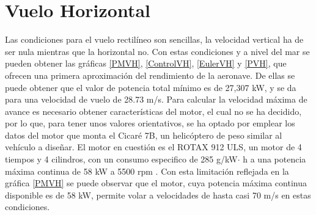 \thispagestyle{empty}
\chapter{Vuelo Horizontal}


Las condiciones para el vuelo rectilíneo son sencillas, la velocidad vertical ha de ser nula mientras que la horizontal no. Con estas condiciones y a nivel del mar se pueden obtener las gráficas \ref{PMVH}, \ref{ControlVH}, \ref{EulerVH} y \ref{PVH}, que ofrecen una primera aproximación del rendimiento de la aeronave. De ellas se puede obtener que el valor de potencia total mínimo es de 27,307 kW, y se da para una velocidad de vuelo de 28.73 m/s. Para calcular la velocidad máxima de avance es necesario obtener características del motor, el cual no se ha decidido, por lo que, para tener unos valores orientativos, se ha optado por emplear los datos del motor que monta el Cicaré 7B, un helicóptero de peso similar al vehículo a diseñar. El motor en cuestión es el ROTAX 912 ULS, un motor de 4 tiempos y 4 cilindros, con un consumo especifico de 285 g/kW$\cdot$ h a una potencia máxima continua de 58 kW a 5500 rpm \citep{ROTAX}. Con esta limitación reflejada en la gráfica \ref{PMVH} se puede observar que el motor, cuya potencia máxima continua disponible es de 58 kW, permite volar a velocidades de hasta casi 70 m/s en estas condiciones.

